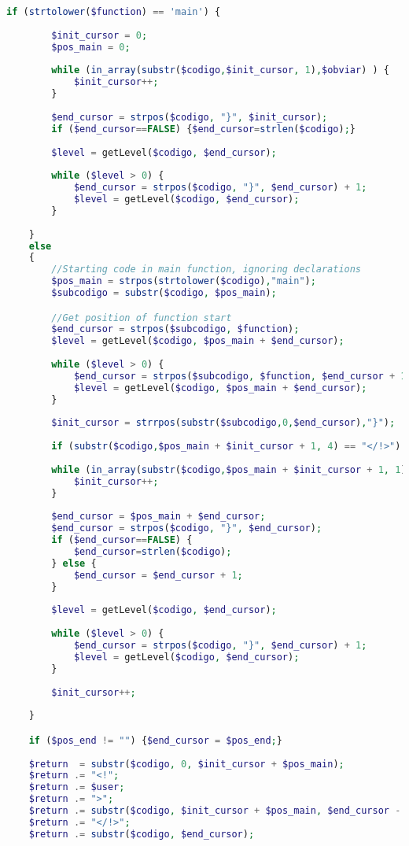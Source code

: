\begin{lstlisting}[language=PHP]
	if (strtolower($function) == 'main') {
		
		$init_cursor = 0;
		$pos_main = 0;
		
		while (in_array(substr($codigo,$init_cursor, 1),$obviar) ) {
			$init_cursor++;
		}
		
		$end_cursor = strpos($codigo, "}", $init_cursor);
		if ($end_cursor==FALSE) {$end_cursor=strlen($codigo);}
		
		$level = getLevel($codigo, $end_cursor);
		
		while ($level > 0) {
			$end_cursor = strpos($codigo, "}", $end_cursor) + 1;
		    $level = getLevel($codigo, $end_cursor);
		}
		
	} 
	else 
	{
		//Starting code in main function, ignoring declarations
		$pos_main = strpos(strtolower($codigo),"main");
		$subcodigo = substr($codigo, $pos_main);

	    //Get position of function start
		$end_cursor = strpos($subcodigo, $function);
		$level = getLevel($codigo, $pos_main + $end_cursor);
	
		while ($level > 0) {
			$end_cursor = strpos($subcodigo, $function, $end_cursor + 1);
			$level = getLevel($codigo, $pos_main + $end_cursor);
		}
	
		$init_cursor = strrpos(substr($subcodigo,0,$end_cursor),"}");
		
		if (substr($codigo,$pos_main + $init_cursor + 1, 4) == "</!>") {$init_cursor = $init_cursor + 4;}
	
		while (in_array(substr($codigo,$pos_main + $init_cursor + 1, 1),$obviar) ) {
			$init_cursor++;
		}
	
		$end_cursor = $pos_main + $end_cursor;
		$end_cursor = strpos($codigo, "}", $end_cursor);
		if ($end_cursor==FALSE) {
			$end_cursor=strlen($codigo);
		} else {
			$end_cursor = $end_cursor + 1;
		}
	
		$level = getLevel($codigo, $end_cursor);
	
		while ($level > 0) {
			$end_cursor = strpos($codigo, "}", $end_cursor) + 1;
		    $level = getLevel($codigo, $end_cursor);
		}
		
		$init_cursor++;
		
	}

    if ($pos_end != "") {$end_cursor = $pos_end;}
	
	$return  = substr($codigo, 0, $init_cursor + $pos_main);
	$return .= "<!";
	$return .= $user;
	$return .= ">";
	$return .= substr($codigo, $init_cursor + $pos_main, $end_cursor - $init_cursor - $pos_main);
	$return .= "</!>";
	$return .= substr($codigo, $end_cursor);
	

\end{lstlisting}
